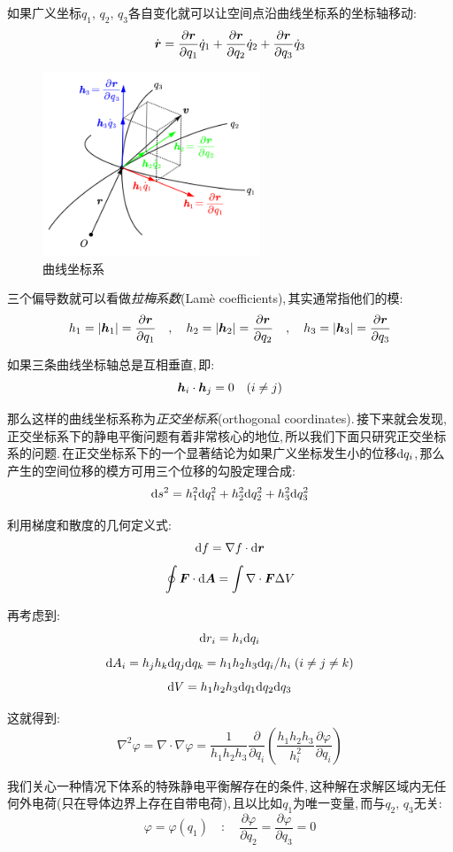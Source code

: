 如果广义坐标$q_1,\,q_2,\,q_3$各自变化就可以让空间点沿曲线坐标系的坐标轴移动:
\[\dot{\boldsymbol{r}}=\frac{\partial \boldsymbol{r}}{\partial q_1}\dot{q}_1+\frac{\partial \boldsymbol{r}}{\partial q_2}\dot{q}_2+\frac{\partial \boldsymbol{r}}{\partial q_3}\dot{q}_3\]

\begin{figure}
	\vspace{-0.6cm}
	\centering
	\includegraphics[width=6.5cm]{image/7-2-17.png}
	\caption{曲线坐标系}\label{fig:7-2-17}
\end{figure}
三个偏导数就可以看做\emph{拉梅系数}(Lam\`e coefficients),\,其实通常指他们的模:
\[h_1=|\boldsymbol{h}_1|=\frac{\partial \boldsymbol{r}}{\partial q_1}\quad ,\quad h_2=|\boldsymbol{h}_2|=\frac{\partial \boldsymbol{r}}{\partial q_2}\quad ,\quad h_3=|\boldsymbol{h}_3|=\frac{\partial \boldsymbol{r}}{\partial q_3}\]

如果三条曲线坐标轴总是互相垂直,\,即:
\[\boldsymbol{h}_i\cdot \boldsymbol{h}_j=0\quad (i\neq j)\]

那么这样的曲线坐标系称为\emph{正交坐标系}(orthogonal coordinates).\,接下来就会发现,\,正交坐标系下的静电平衡问题有着非常核心的地位,\,所以我们下面只研究正交坐标系的问题.\,在正交坐标系下的一个显著结论为如果广义坐标发生小的位移$\textrm{d} q_i$,\,那么产生的空间位移的模方可用三个位移的勾股定理合成:
\[\textrm{d} s^2=h_1^2\textrm{d} q_1^2+h_2^2\textrm{d} q_2^2+h_3^2\textrm{d} q_3^2\]

利用梯度和散度的几何定义式:
\[\textrm{d} f=\nabla f\cdot \textrm{d}\boldsymbol{r}\]
\[\oint \boldsymbol{F}\cdot \textrm{d} \boldsymbol{A}=\int \nabla \cdot \boldsymbol{F}\Delta V\]

再考虑到:
\[\textrm{d} r_i=h_i\textrm{d} q_i\]
\[\textrm{d} A_{i}=h_jh_k\textrm{d} q_j\textrm{d} q_k=h_1h_2h_3\textrm{d} q_i/h_i\;(i\neq j\neq k)\]
\[\textrm{d} V=h_1h_2h_3\textrm{d} q_1\textrm{d} q_2\textrm{d} q_3\]

这就得到:
\[\nabla^2\varphi=\nabla\cdot\nabla\varphi=\frac{1}{h_1h_2h_3}\frac{\partial}{\partial q_i}\left(\frac{h_1h_2h_3}{h_i^2}\frac{\partial \varphi}{\partial q_i}\right)\]

我们关心一种情况下体系的特殊静电平衡解存在的条件,\,这种解在求解区域内无任何外电荷(只在导体边界上存在自带电荷),\,且以比如$q_1$为唯一变量,\,而与$q_2,\,q_3$无关:
\[\varphi=\varphi(q_1)\quad :\quad \frac{\partial \varphi}{\partial q_2}=\frac{\partial \varphi}{\partial q_3}=0\]

